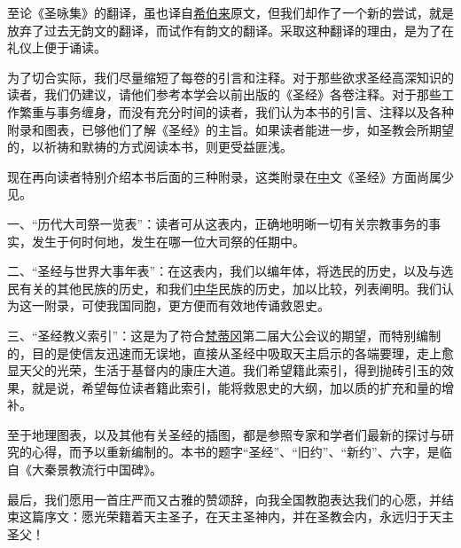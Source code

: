 至论《圣咏集》的翻译，虽也译自\uline{希伯来}原文，但我们却作了一个新的尝试，就是放弃了过去无韵文的翻译，而试作有韵文的翻译。采取这种翻译的理由，是为了在礼仪上便于诵读。

为了切合实际，我们尽量缩短了每卷的引言和注释。对于那些欲求圣经高深知识的读者，我们仍建议，请他们参考本学会以前出版的《圣经》各卷注释。对于那些工作繁重与事务缠身，而没有充分时间的读者，我们认为本书的引言、注释以及各种附录和图表，已够他们了解《圣经》的主旨。如果读者能进一步，如圣教会所期望的，以祈祷和默祷的方式阅读本书，则更受益匪浅。

现在再向读者特别介绍本书后面的三种附录，这类附录在\uline{中}文《圣经》方面尚属少见。

一、“历代大司祭一览表”：读者可从这表内，正确地明晰一切有关宗教事务的事实，发生于何时何地，发生在哪一位大司祭的任期中。

二、“圣经与世界大事年表”：在这表内，我们以编年体，将选民的历史，以及与选民有关的其他民族的历史，和我们\uline{中华}民族的历史，加以比较，列表阐明。我们认为这一附录，可使我国同胞，更方便而有效地传诵救恩史。

三、“圣经教义索引”：这是为了符合\uline{梵蒂冈}第二届大公会议的期望，而特别编制的，目的是使信友迅速而无误地，直接从圣经中吸取天主启示的各端要理，走上愈显天父的光荣，生活于基督内的康庄大道。我们希望籍此索引，得到抛砖引玉的效果，就是说，希望每位读者籍此索引，能将救恩史的大纲，加以质的扩充和量的增补。

至于地理图表，以及其他有关圣经的插图，都是参照专家和学者们最新的探讨与研究的心得，而予以重新编制的。本书的题字“圣经”、“旧约”、“新约”、六字，是临自《大秦景教流行中国碑》。

最后，我们愿用一首庄严而又古雅的赞颂辞，向我全国教胞表达我们的心愿，并结束这篇序文：愿光荣籍着天主圣子，在天主圣神内，并在圣教会内，永远归于天主圣父！


